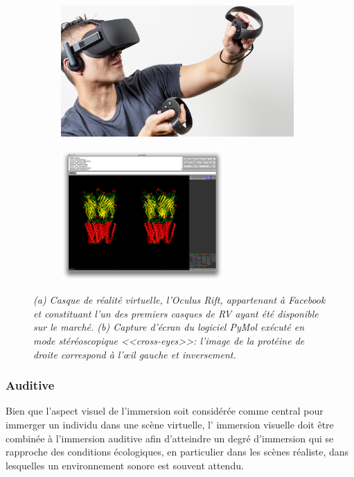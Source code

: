 \begin{figure}
\begin{subfigure}{.6\textwidth}
  \centering
  {\includegraphics[height=5cm]{./figures/ch2/occulus}}
    \caption{}
  \label{Fig:occulus}
\end{subfigure}
\begin{subfigure}{.4\textwidth}
  \centering
  {\includegraphics[height=5cm]{./figures/ch2/pymol_stereo}}
    \caption{}
  \label{Fig:pymol_stereo}
\end{subfigure}
\caption[(a) Casque de Réalité Virtuelle. (b) Capture d'écran du logiciel PyNol en mode stéréoscopique.]{\it (a) Casque de réalité virtuelle, l'Oculus Rift, appartenant à Facebook et constituant l'un des premiers casques de RV ayant été disponible sur le marché. (b) Capture d'écran du logiciel PyMol exécuté en mode stéréoscopique <<cross-eyes>>: l'image de la protéine de droite correspond à l'œil gauche et inversement.}
\end{figure}



\subsubsection{Auditive} \label{immersion_audio}

Bien que l'aspect visuel de l'immersion soit considérée comme central pour immerger un individu dans une scène virtuelle, l' immersion visuelle doit être combinée à l'immersion auditive afin d'atteindre un degré d'immersion qui se rapproche des conditions écologiques, en particulier dans les scènes réaliste, dans lesquelles un environnement sonore est souvent attendu.

